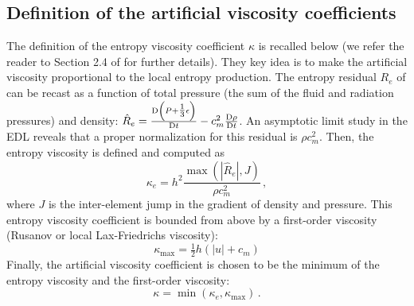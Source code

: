 \documentclass[times,doublespace]{fldauth}%
\begin{document}
\subsection{Definition of the artificial viscosity coefficients}\label{sec:visc-coeff-def}
%
The definition of the  entropy viscosity coefficient $\kappa$ is recalled below (we refer the reader to Section 2.4 of \cite{our_jcp_radhy_paper} for further details). They key idea is to make the artificial viscosity proportional to the 
local entropy production. The entropy residual $R_e$ of  can be recast
as a function of total pressure (the sum of the fluid and radiation pressures) and density: $\hat R_e = \frac{\textrm{D} \left(P+\tfrac 1 3 \epsilon\right)}{\textrm{D} t} - c^2_m \frac{\textrm{D} \rho}{\textrm{D} t}$. An asymptotic limit study in the EDL reveals that a proper normalization for this residual is $\rho c^2_m$. Then, the entropy viscosity is defined and computed as
\begin{equation}\label{eq:visc-def}
\kappa_e = h^2 \frac{\max \left( |\hat R_e|, J \right)}{\rho c^2_m} \, ,
\end{equation}
where $J$ is the inter-element jump in the gradient of density and pressure.
This entropy viscosity coefficient is bounded from above by a first-order viscosity (Rusanov or local Lax-Friedrichs viscosity):
\begin{equation}
\kappa_\text{max} = \tfrac 1 2 h \left( |u| + c_m \right) \nonumber
\end{equation}
Finally, the artificial viscosity coefficient is chosen to be the minimum of the entropy viscosity and the first-order viscosity:
\begin{equation}
\kappa = \min \left( \kappa_e, \kappa_\text{max} \right) \nonumber \,.
\end{equation}

\end{document}
